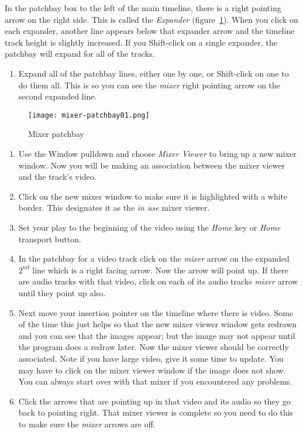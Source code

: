 In the patchbay box to the left of the main timeline, there is a right pointing arrow on the right side.  This is called the \textit{Expander} (figure~\ref{fig:mixer-patchbay01}).  When you click on each expander, another line appears below that expander arrow and the timeline track height is slightly increased.  If you Shift-click on a single expander, the patchbay will expand for all of the tracks.

\begin{enumerate}
    \item Expand all of the patchbay lines, either one by one, or Shift-click on one to do them all. This is so you can see the \textit{mixer} right pointing arrow on the second expanded line.    
\end{enumerate}

\begin{figure}[htpb]
	\centering
	\texttt{[image: mixer-patchbay01.png]}
	\caption{Mixer  patchbay}
	\label{fig:mixer-patchbay01}
\end{figure}

\begin{enumerate}[resume]
	\item Use the Window pulldown and choose \textit{Mixer Viewer} to bring up a new mixer window.  Now you will be making an association between the mixer viewer and the track’s video.
    \item Click on the new mixer window to make sure it is highlighted with a white border. This designates it as the \textit{in use} mixer viewer.
    \item Set your play to the beginning of the video using the \textit{Home} key or \textit{Home} transport button.
    \item In the patchbay for a video track click on the \textit{mixer} arrow on the expanded $2^{nd}$ line which is a right facing arrow.  Now the arrow will point up.  If there are audio tracks with that video, click on each of its audio tracks \textit{mixer} arrow until they point up also.
    \item Next move your insertion pointer on the timeline where there is video.  Some of the time this just helps so that the new mixer viewer window gets redrawn and you can see that the images appear; but the image may not appear until the program does a redraw later.  Now the mixer viewer should be
    correctly associated.  Note if you have large video, give it some time to update.  You may have to click on the mixer viewer window if the image does not show.  You can always start over with that mixer if you encountered any problems.
    \item Click the arrows that are pointing up in that video and its audio so they go back to pointing right. That mixer viewer is complete so you need to do this to make sure the \textit{mixer} arrows are off.
\end{enumerate}

